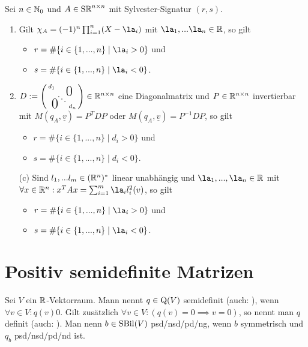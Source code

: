\documentclass[../../main.tex]{subfiles}
\begin{document}
\begin{kor}\label{14.1.5}
Sei $n\in \mathbb N_0$ und $A\in \operatorname{S\mathbb R}^{n\times n}$ mit Sylvester-Signatur $(r,s)$.
\begin{enumerate}[\normalfont(a)]
\item Gilt $\chi_A=(-1)^n\prod_{i=1}^n(X-\la_i)$ mit $\la_1,...\la_n\in \R$, so gilt
\begin{itemize}
\item $r=\#\{i\in \{1,...,n\}\mid \la_i>0\}$ und
\item $s=\#\{i\in \{1,...,n\}\mid \la_i<0\}$.
\end{itemize}
		
\item $D:=\left(\begin{smallmatrix}
d_1 & & \llap{$\overset{\blap{\LARGE 0}}{~}$} \\
& \ddots &\\
\rlap{\tlap{\LARGE 0}} & & d_n\end{smallmatrix}\right)\in \R^{n\times n}$ eine Diagonalmatrix und $P\in \mathbb R^{n\times n}$ invertierbar mit $M(q_A,\underline{v})=P^TDP$ oder $M(q_A,\underline{v})=P^{-1}DP$, so gilt
\begin{itemize}
\item $r=\#\{i\in \{1,...,n\}\mid d_i>0\}$ und
\item $s=\#\{i\in \{1,...,n\}\mid d_i<0\}$.
\end{itemize}
		
\item[(c)] Sind $l_1,...l_m\in (\mathbb R^n)^*$ linear unabhängig und $\la_1,...,\la_n\in \R$ mit $\forall x\in \R^n: x^TAx=\sum_{i=1}^m\la_il_i^2(v)$, so gilt
\begin{itemize}
\item $r=\#\{i\in \{1,...,n\}\mid \la_i>0\}$ und
\item $s=\#\{i\in \{1,...,n\}\mid \la_i<0\}$.
\end{itemize}
\end{enumerate}
\end{kor}

\section{Positiv semidefinite Matrizen}

\begin{df}\label{14.2.1}
Sei $V$ ein $\mathbb R$-Vektorraum. Mann nennt $q\in\operatorname{Q}(V)$  semidefinit (auch: ), wenn $\forall v\in V: q(v)$\case{$\ge$}{$\le$}$0$. Gilt zusätzlich $\forall v\in V: (q(v)=0\implies v=0)$, so nennt man $q$  definit (auch: ). Man nenn $b\in \operatorname{SBil}(V)$ psd/nsd/pd/ng, wenn $b$ symmetrisch und $q_b$ psd/nsd/pd/nd ist.
\end{df}
\end{document}
